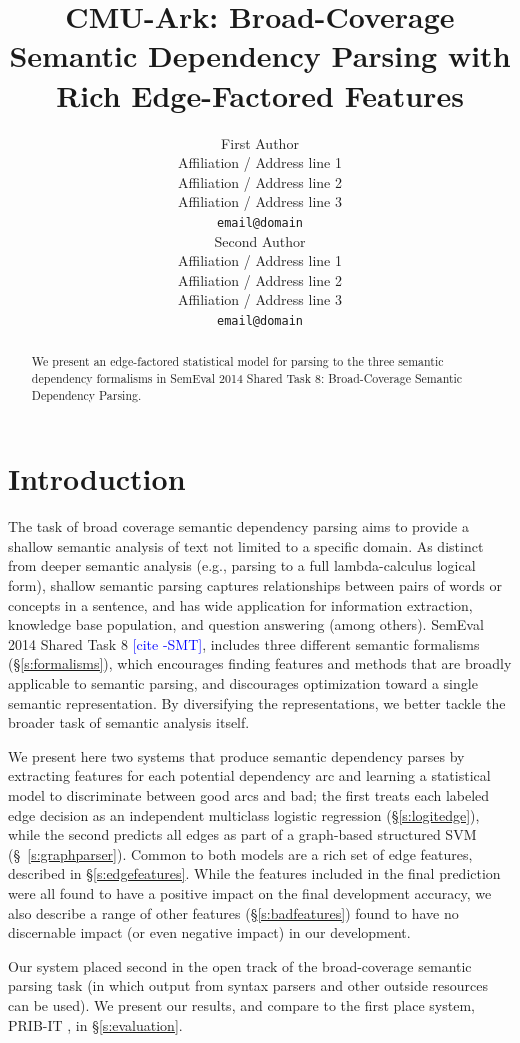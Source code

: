 \documentclass[11pt]{article}
\title{CMU-Ark: Broad-Coverage Semantic Dependency Parsing with Rich
Edge-Factored Features \sam{better title, please}}
\author{First Author \\
  Affiliation / Address line 1 \\
  Affiliation / Address line 2 \\
  Affiliation / Address line 3 \\
  {\tt email@domain} \\\And
  Second Author \\
  Affiliation / Address line 1 \\
  Affiliation / Address line 2 \\
  Affiliation / Address line 3 \\
  {\tt email@domain} \\}
\date{}
\newcommand{\sam}[1]{\textcolor{blue}{[#1 -SMT]}}
\begin{document}
\maketitle

\begin{abstract}
We present an edge-factored statistical model for parsing to the three semantic
dependency formalisms in SemEval 2014 Shared Task 8: Broad-Coverage Semantic
Dependency Parsing.

\end{abstract}



\section{Introduction}

The task of broad coverage semantic dependency parsing aims to provide a
shallow semantic analysis of text not limited to a specific domain.
As distinct from deeper semantic analysis (e.g., parsing to a full
lambda-calculus logical form), shallow semantic parsing captures relationships
between pairs of words or concepts in a sentence, and has wide application for
information extraction, knowledge base population, and question answering (among others).
SemEval 2014 Shared Task 8 \sam{cite}, includes three different semantic
formalisms (\S\ref{s:formalisms}), which encourages finding features and methods
that are broadly applicable to semantic parsing, and discourages optimization
toward a single semantic representation.
By diversifying the representations, we better tackle the broader task of
semantic analysis itself.

We present here two systems that produce semantic dependency parses by extracting
features for each potential dependency arc and learning a statistical model to
discriminate between good arcs and bad;
the first treats each labeled edge decision as an independent multiclass
logistic regression (\S\ref{s:logitedge}), while the second predicts all edges
as part of a graph-based structured SVM (\S~\ref{s:graphparser}). 
Common to both models are a rich set of edge features, described in
\S\ref{s:edgefeatures}.
While the features included in the final prediction were all found to have a
positive impact on the final development accuracy, we also describe a range of
other features (\S\ref{s:badfeatures}) found to have no discernable impact (or
even negative impact) in our development.

Our system placed second in the open track of the broad-coverage semantic
parsing task (in which output from syntax parsers and other outside resources can be used).
We present our results, and compare to the first place system, PRIB-IT
\cite{martins_prib_2014}, in \S\ref{s:evaluation}.
\end{document}
